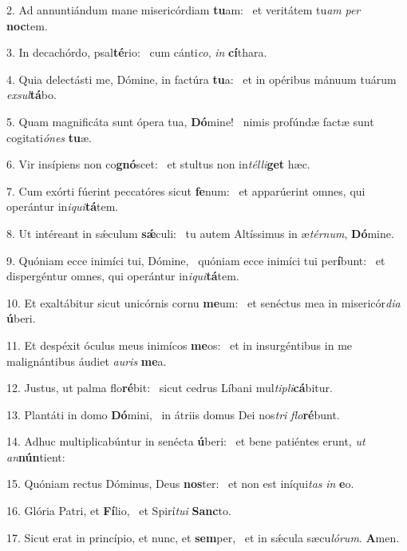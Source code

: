 2. Ad annuntiándum mane misericórdiam \textbf{tu}am: \ast\  et veritátem tu\textit{am} \textit{per} \textbf{noc}tem.\

3. In decachórdo, psal\textbf{té}rio: \ast\  cum cánti\textit{co}, \textit{in} \textbf{cí}thara.\

4. Quia delectásti me, Dómine, in factúra \textbf{tu}a: \ast\  et in opéribus mánuum tuárum \textit{ex}\textit{sul}\textbf{tá}bo.\

5. Quam magnificáta sunt ópera tua, \textbf{Dó}mine! \ast\  nimis profúndæ factæ sunt cogitati\textit{ó}\textit{nes} \textbf{tu}æ.\

6. Vir insípiens non co\textbf{gnó}scet: \ast\  et stultus non in\textit{tél}\textit{li}\textbf{get} hæc.\

7. Cum exórti fúerint peccatóres sicut \textbf{fe}num: \ast\  et apparúerint omnes, qui operántur in\textit{i}\textit{qui}\textbf{tá}tem.\

8. Ut intéreant in sǽculum \textbf{sǽ}culi: \ast\  tu autem Altíssimus in æ\textit{tér}\textit{num}, \textbf{Dó}mine.\

9. Quóniam ecce inimíci tui, Dómine, \dag\  quóniam ecce inimíci tui per\textbf{í}bunt: \ast\  et dispergéntur omnes, qui operántur in\textit{i}\textit{qui}\textbf{tá}tem.\

10. Et exaltábitur sicut unicórnis cornu \textbf{me}um: \ast\  et senéctus mea in misericór\textit{di}\textit{a} \textbf{ú}beri.\

11. Et despéxit óculus meus inimícos \textbf{me}os: \ast\  et in insurgéntibus in me malignántibus áudiet \textit{au}\textit{ris} \textbf{me}a.\

12. Justus, ut palma flo\textbf{ré}bit: \ast\  sicut cedrus Líbani mul\textit{ti}\textit{pli}\textbf{cá}bitur.\

13. Plantáti in domo \textbf{Dó}mini, \ast\  in átriis domus Dei nos\textit{tri} \textit{flo}\textbf{ré}bunt.\

14. Adhuc multiplicabúntur in senécta \textbf{ú}beri: \ast\  et bene patiéntes erunt, \textit{ut} \textit{an}\textbf{nún}tient:\

15. Quóniam rectus Dóminus, Deus \textbf{nos}ter: \ast\  et non est iníqui\textit{tas} \textit{in} \textbf{e}o.\

16. Glória Patri, et \textbf{Fí}lio, \ast\  et Spirí\textit{tu}\textit{i} \textbf{Sanc}to.\

17. Sicut erat in princípio, et nunc, et \textbf{sem}per, \ast\  et in sǽcula sæcu\textit{ló}\textit{rum}. \textbf{A}men.\

